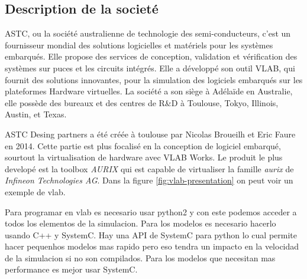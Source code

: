 \subsection{Description de la societ\'e}
ASTC, ou la société australienne de technologie des semi-conducteurs, c’est un fournisseur mondial des solutions logicielles et matériels pour les systèmes embarqués. Elle propose des services de conception, validation et vérification des systèmes sur puces et les circuits intégrés. Elle a développé son outil VLAB, qui fournit des solutions innovantes, pour la simulation des logiciels embarqués sur les plateformes Hardware virtuelles. La société a son siège à Adélaïde en Australie, elle possède des bureaux et des centres de R&D à Toulouse, Tokyo, Illinois, Austin, et Texas. 

ASTC Desing partners a été créée \`a toulouse par Nicolas Broueilh et Eric Faure en 2014. Cette partie est plus focalis\'e en la conception de logiciel embarqu\'e, sourtout la virtualisation de hardware avec VLAB Works. Le produit le plus develop\'e est la toolbox \textit{AURIX} qui est capable de virtualiser la famille \textit{aurix} de \textit{Infineon Technologies AG}. Dans la figure \ref{fig:vlab-presentation} on peut voir un exemple de vlab.

Para programar en vlab es necesario usar python2 y con este podemos acceder a todos los elementos de la simulacion. Para los modelos es necesario hacerlo usando C++ y SystemC. Hay una API de SystemC para python lo cual permite hacer pequenhos modelos mas rapido pero eso tendra un impacto en la velocidad de la simulacion si no son compilados. Para los modelos que necesitan mas performance es mejor usar SystemC.



